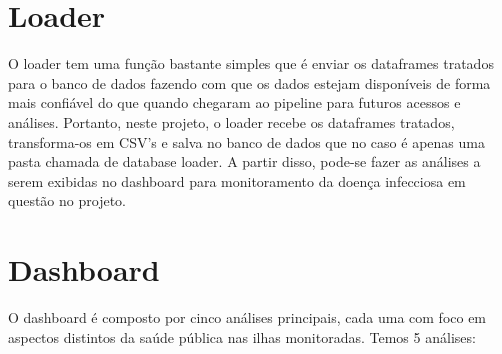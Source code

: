\documentclass[a4paper,12pt]{article}
\begin{document}
\section{Loader}

O loader tem uma função bastante simples que é enviar os dataframes tratados para o banco de dados fazendo com que os dados estejam disponíveis de forma mais confiável do que quando chegaram ao pipeline para futuros acessos e análises. Portanto, neste projeto, o loader recebe os dataframes tratados, transforma-os em CSV's e salva no banco de dados que no caso é apenas uma pasta chamada de database loader. A partir disso, pode-se fazer as análises a serem exibidas no dashboard para monitoramento da doença infecciosa em questão no projeto.


\section{Dashboard}

O dashboard é composto por cinco análises principais, cada uma com foco em aspectos distintos da saúde pública nas ilhas monitoradas. Temos 5 análises:
\end{document}
